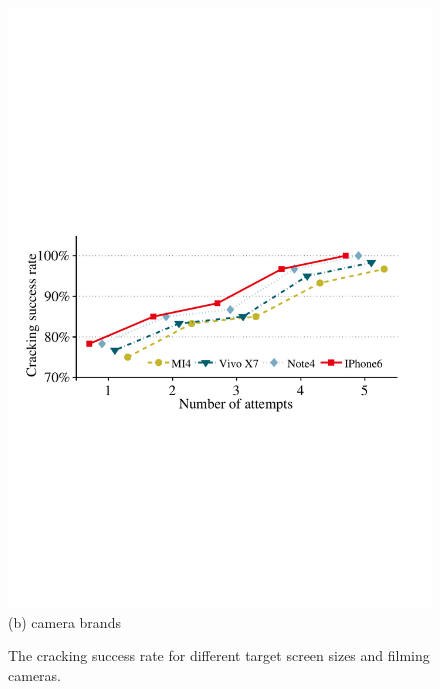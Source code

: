 \begin{figure}[!t]
{\begin{minipage}[t]{0.4\textwidth}
                \includegraphics[width=\textwidth]{fig/camera_brands.pdf}\\
                \centering  (b) camera brands
             \end{minipage}
        }
        \vspace{-1mm}
        \caption{The cracking success rate for different target screen sizes and filming cameras. }
        \label{fig:screen_size}
        \vspace{-3mm}
    \end{figure}

